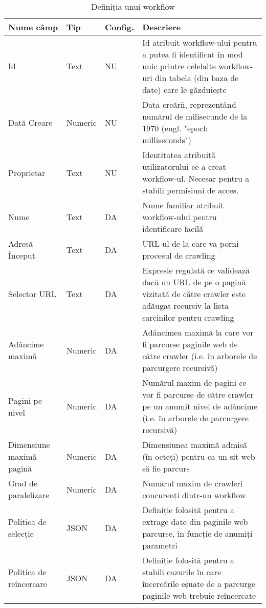 \begin{table}[h]
	\centering
    \begin{tabular}{|M{2.5cm}|M{1.6cm}|M{1.25cm}|M{7.25cm}|}
    	\hline 
    	Nume câmp & Tip & Config. & Descriere \\ \hline
    	
    Id & Text & NU & Id atribuit workflow-ului pentru a putea fi identificat în mod unic printre celelalte workflow-uri din tabela (din baza de date) care le găzduiește \\ \hline
    
    Dată Creare & Numeric & NU & Data creării, reprezentând numărul de milisecunde de la 1970 (engl. "epoch milliseconds") \\ \hline
    
    Proprietar & Text & NU & Identitatea atribuită utilizatorului ce a creat workflow-ul. Necesar pentru a stabili permisiuni de acces. \\ \hline
    
    Nume & Text & DA & Nume familiar atribuit workflow-ului pentru identificare facilă \\ \hline
    
    Adresă Început & Text & DA & URL-ul de la care va porni procesul de crawling \\ \hline
    
    Selector URL & Text & DA & Expresie regulată ce validează dacă un URL de pe o pagină vizitată de către crawler este adăugat recursiv la lista sarcinilor pentru crawling \\ \hline
    
    Adâncime maximă & Numeric & DA & Adâncimea maximă la care vor fi parcurse paginile web de către crawler (i.e. în arborele de parcurgere recursivă) \\ \hline
    
    Pagini pe nivel & Numeric & DA & Numărul maxim de pagini ce vor fi parcurse de către crawler pe un anumit nivel de adâncime (i.e. în arborele de parcurgere recursivă) \\ \hline
    
    Dimensiune maximă pagină & Numeric & DA & Dimensiunea maximă admisă (în octeți) pentru ca un sit web să fie parcurs \\ \hline
    
    Grad de paralelizare & Numeric & DA & Numărul maxim de crawleri concurenți dintr-un workflow \\ \hline
    
    Politica de selecție & JSON & DA & Definiție folosită pentru a extrage date din paginile web parcurse, în funcție de anumiți parametri \\ \hline
    
    Politica de reîncercare & JSON & DA & Definiție folosită pentru a stabili cazurile în care încercările eșuate de a parcurge paginile web trebuie reîncercate \\ \hline
    
    \end{tabular}
    \caption{Definiția unui workflow}
\end{table}
\clearpage